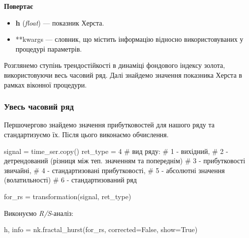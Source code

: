 \documentclass[
  letterpaper,
]{report}
\newenvironment{Shaded}{\begin{snugshade}}{\end{snugshade}}
\newcommand{\CommentTok}[1]{\textcolor[rgb]{0.37,0.37,0.37}{#1}}
\newcommand{\DecValTok}[1]{\textcolor[rgb]{0.68,0.00,0.00}{#1}}
\newcommand{\NormalTok}[1]{\textcolor[rgb]{0.00,0.23,0.31}{#1}}
\newcommand{\OperatorTok}[1]{\textcolor[rgb]{0.37,0.37,0.37}{#1}}
\newcommand{\VariableTok}[1]{\textcolor[rgb]{0.07,0.07,0.07}{#1}}
\providecommand{\tightlist}{%
  \setlength{\itemsep}{0pt}\setlength{\parskip}{0pt}}\usepackage{longtable,booktabs,array}
\begin{document}
\textbf{Повертає}

\begin{itemize}
\tightlist
\item
  \textbf{h} (\emph{float}) --- показник Херста.
\item
  **kwargs --- словник, що містить інформацію відносно використовуваних
  у процедурі параметрів.
\end{itemize}

Розглянемо ступінь трендостійкості в динаміці фондового індексу золота,
використовуючи весь часовий ряд. Далі знайдемо значення показника Херста
в рамках віконної процедури.

\hypertarget{ux443ux432ux435ux441ux44c-ux447ux430ux441ux43eux432ux438ux439-ux440ux44fux434}{%
\subsubsection{Увесь часовий
ряд}\label{ux443ux432ux435ux441ux44c-ux447ux430ux441ux43eux432ux438ux439-ux440ux44fux434}}

Першочергово знайдемо значення прибутковостей для нашого ряду та
стандартизуємо їх. Після цього виконаємо обчислення.

\begin{Shaded}
\begin{Highlighting}[]
\NormalTok{signal }\OperatorTok{=}\NormalTok{ time\_ser.copy()}
\NormalTok{ret\_type }\OperatorTok{=} \DecValTok{4}    \CommentTok{\# вид ряду: }
                \CommentTok{\# 1 {-} вихідний, }
                \CommentTok{\# 2 {-} детрендований (різниця між теп. значенням та попереднім)}
                \CommentTok{\# 3 {-} прибутковості звичайні, }
                \CommentTok{\# 4 {-} стандартизовані прибутковості, }
                \CommentTok{\# 5 {-} абсолютні значення (волатильності)}
                \CommentTok{\# 6 {-} стандартизований ряд}

\NormalTok{for\_rs }\OperatorTok{=}\NormalTok{ transformation(signal, ret\_type) }
\end{Highlighting}
\end{Shaded}

Виконуємо \emph{R/S}-аналіз:

\begin{Shaded}
\begin{Highlighting}[]
\NormalTok{h, info }\OperatorTok{=}\NormalTok{ nk.fractal\_hurst(for\_rs, corrected}\OperatorTok{=}\VariableTok{False}\NormalTok{, show}\OperatorTok{=}\VariableTok{True}\NormalTok{)}
\end{Highlighting}
\end{Shaded}
\end{document}
